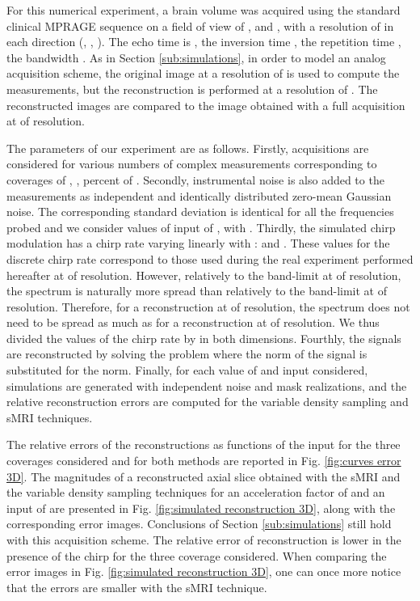 \documentclass[10pt,draftcls, onecolumn]{IEEEtran}
\begin{document}
For this numerical experiment, a brain volume was acquired using the standard clinical MPRAGE sequence on a field of view of ,  and , with a resolution of  in each direction (, , ). The echo time is , the inversion time , the repetition time , the bandwidth . As in Section \ref{sub:simulations}, in order to model an analog acquisition scheme, the original image at a resolution of  is used to compute the measurements, but the reconstruction is performed at a resolution of . The reconstructed images are compared to the image obtained with a full acquisition at  of resolution. 

The parameters of our experiment are as follows. Firstly, acquisitions are considered for various numbers  of complex measurements corresponding to coverages of , ,  percent of . Secondly, instrumental noise is also added to the measurements as independent and identically distributed zero-mean Gaussian noise. The corresponding standard deviation  is identical for all the frequencies probed and we consider values of input  of , with . Thirdly, the simulated chirp modulation has a chirp rate varying linearly with :  and . These values for the discrete chirp rate correspond to those used during the real experiment performed hereafter at  of resolution. However, relatively to the band-limit at  of resolution, the spectrum is naturally more spread than relatively to the band-limit at  of resolution. Therefore, for a reconstruction at  of resolution, the spectrum does not need to be spread as much as for a reconstruction at  of resolution. We thus divided the values of the chirp rate by  in both dimensions. Fourthly, the signals are reconstructed by solving the  problem where the  norm of the signal  is substituted for the  norm. Finally, for each value of  and input  considered,  simulations are generated with independent noise and mask realizations, and the relative reconstruction errors are computed for the variable density sampling and sMRI techniques.

The relative errors of the reconstructions as functions of the input  for the three coverages considered and for both methods are reported in Fig. \ref{fig:curves error 3D}. The magnitudes of a reconstructed axial slice obtained with the sMRI and the variable density sampling techniques for an acceleration factor of  and an input  of  are presented in Fig. \ref{fig:simulated reconstruction 3D}, along with the corresponding error images. Conclusions of Section \ref{sub:simulations} still hold with this acquisition scheme. The relative error of reconstruction is lower in the presence of the chirp for the three coverage considered. When comparing the error images in Fig. \ref{fig:simulated reconstruction 3D}, one can once more notice that the errors are smaller with the sMRI technique.
\end{document}
